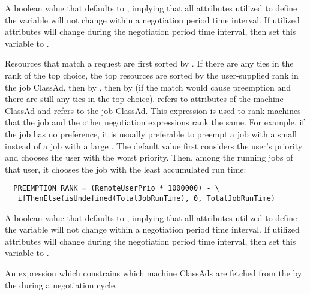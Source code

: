 \begin{description}
\label{param:PreemptionRequirementsStable} 
\item[\Macro{PREEMPTION\_REQUIREMENTS\_STABLE}]
  A boolean value that defaults to , implying that all attributes
  utilized to define the  variable will not
  change within a negotiation period time interval.
  If utilized attributes will change during the 
  negotiation period time interval, then set this variable to . 

\label{param:PreemptionRank}
\item[\Macro{PREEMPTION\_RANK}]
  Resources that match a request are first sorted by
  .  If there are any ties in the
  rank of the top choice, the top resources are sorted by the
  user-supplied rank in the job ClassAd, then by
  , then by
   (if the match would cause preemption and
  there are still any ties in the top choice).  \verb@MY@ refers to
  attributes of the machine ClassAd and \verb@TARGET@ refers to the
  job ClassAd.  This expression is used to rank machines that the job
  and the other negotiation expressions rank the same.  For example,
  if the job has no preference, it is usually preferable to preempt a
  job with a small  instead of a job with a large
  .  
  The default value first considers the user's priority and chooses
  the user with the worst priority.
  Then, among the running jobs of that user, 
  it chooses the job with the least accumulated run time:
\footnotesize
\begin{verbatim}
  PREEMPTION_RANK = (RemoteUserPrio * 1000000) - \ 
   ifThenElse(isUndefined(TotalJobRunTime), 0, TotalJobRunTime)
\end{verbatim}
\normalsize

\label{param:PreemptionRankStable}
\item[\Macro{PREEMPTION\_RANK\_STABLE}]
  A boolean value that defaults to , implying that all attributes
  utilized to define the \MacroNI{PREEMPTION\_RANK} variable will not
  change within a negotiation period time interval.
  If utilized attributes will change during the 
  negotiation period time interval, then set this variable to .

\label{param:NegotiatorSlotConstraint}
\item[\Macro{NEGOTIATOR\_SLOT\_CONSTRAINT}]
  An expression which constrains which machine ClassAds are fetched from the
  \Condor{collector} by the \Condor{negotiator} during a negotiation
  cycle.


\end{description}
